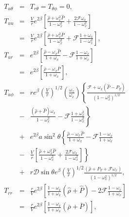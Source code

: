 \documentclass[twocolumn,superscriptaddress]{revtex4}
\begin{document}
\begin{eqnarray}
T_{u\theta}&=&T_{r\theta}=T_{\theta\phi}=0,\\
T_{uu}&=&\frac{V}{r}e^{2\beta}\left[\frac{\hat\rho+\omega_x^2 \hat P}{1-\omega_x^2}+  \frac{2\mathcal{F}\omega_x}{1-\omega_x^2} \right]\nonumber\\
&=&\frac{V}{r}e^{2\beta}\left[\frac{\bar\rho+\omega_x^2 \bar P}{1-\omega_x^2}+  \mathcal{F}\frac{1+\omega_x}{1-\omega_x^2} \right],\\
T_{ur}&=&e^{2\beta}\left[ \frac{\hat\rho-\omega_x \hat P}{1+\omega_x}  -\mathcal{F}\frac{1-\omega_x}{1+\omega_x}\right]\nonumber\\
&=&e^{2\beta}\left[ \frac{\bar\rho-\omega_x \bar P}{1+\omega_x}\right],\\
T_{u\phi}&=&re^{\beta}\left(\frac{V}{r}\right)^{1/2}\left(\frac{\omega_z}{\omega_x}\right)\left\{
\frac{\mathcal{F}+\omega_x(\hat P-P_T)}{(1-\omega_x^2)^{1/2}} \right. \nonumber\\
&-&\left.\frac{(\hat\rho+\hat P)\omega_x}{1-\omega_x^2}-\mathcal{F}\frac{1+\omega_x^2}{1-\omega_x^2}\right\}\nonumber\\
&+&e^{2\beta} a \sin^2\theta\left\{ \frac{\hat\rho-\omega_x \hat P}{1+\omega_x}-\mathcal{F}\frac{1-\omega_x}{1+\omega_x} \right.\nonumber\\
&-&\left.\frac{V}{r}\left[\frac{\hat\rho+\omega_x^2\hat P}{1-\omega_x^2}+\frac{2\mathcal{F}\omega_x}{1-\omega_x^2}\right]\right\}\nonumber\\
&+&r\mathcal{D}\sin\theta e^{\beta}\left(\frac{V}{r}\right)^{1/2} \frac{(\hat\rho+P_T+\mathcal{F}\omega_x)}{(1-\omega_x^2)^{1/2}},\\
T_{rr}&=&\frac{r}{V}e^{2\beta}\left[ \frac{1-\omega_x}{1+\omega_x}(\hat\rho + \hat P)
-2\mathcal{F}\frac{1-\omega_x}{1+\omega_x}\right]\nonumber\\
&=&\frac{r}{V}e^{2\beta}\left[ \frac{1-\omega_x}{1+\omega_x}(\bar\rho + \bar P)
\right],
\end{eqnarray}
\end{document}
